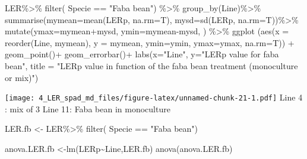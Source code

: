 \documentclass[
]{article}
\newenvironment{Shaded}{\begin{snugshade}}{\end{snugshade}}
\newcommand{\AttributeTok}[1]{\textcolor[rgb]{0.77,0.63,0.00}{#1}}
\newcommand{\FunctionTok}[1]{\textcolor[rgb]{0.00,0.00,0.00}{#1}}
\newcommand{\NormalTok}[1]{#1}
\newcommand{\OtherTok}[1]{\textcolor[rgb]{0.56,0.35,0.01}{#1}}
\newcommand{\SpecialCharTok}[1]{\textcolor[rgb]{0.00,0.00,0.00}{#1}}
\newcommand{\StringTok}[1]{\textcolor[rgb]{0.31,0.60,0.02}{#1}}
\begin{document}
\begin{Shaded}
\begin{Highlighting}[]
\NormalTok{LER}\SpecialCharTok{\%\textgreater{}\%}
  \FunctionTok{filter}\NormalTok{( Specie }\SpecialCharTok{==} \StringTok{"Faba bean"}\NormalTok{) }\SpecialCharTok{\%\textgreater{}\%}
  \FunctionTok{group\_by}\NormalTok{(Line)}\SpecialCharTok{\%\textgreater{}\%}
  \FunctionTok{summarise}\NormalTok{(}\AttributeTok{mymean=}\FunctionTok{mean}\NormalTok{(LERp, }\AttributeTok{na.rm=}\NormalTok{T),}
            \AttributeTok{mysd=}\FunctionTok{sd}\NormalTok{(LERp, }\AttributeTok{na.rm=}\NormalTok{T))}\SpecialCharTok{\%\textgreater{}\%}
  \FunctionTok{mutate}\NormalTok{(}\AttributeTok{ymax=}\NormalTok{mymean}\SpecialCharTok{+}\NormalTok{mysd, }\AttributeTok{ymin=}\NormalTok{mymean}\SpecialCharTok{{-}}\NormalTok{mysd, ) }\SpecialCharTok{\%\textgreater{}\%}
  \FunctionTok{ggplot}\NormalTok{ (}\FunctionTok{aes}\NormalTok{(}\AttributeTok{x =} \FunctionTok{reorder}\NormalTok{(Line, mymean), }\AttributeTok{y =}\NormalTok{ mymean,}
              \AttributeTok{ymin=}\NormalTok{ymin, }\AttributeTok{ymax=}\NormalTok{ymax, }\AttributeTok{na.rm=}\NormalTok{T)) }\SpecialCharTok{+} 
  \FunctionTok{geom\_point}\NormalTok{()}\SpecialCharTok{+}
  \FunctionTok{geom\_errorbar}\NormalTok{()}\SpecialCharTok{+}
  \FunctionTok{labs}\NormalTok{(}\AttributeTok{x=}\StringTok{"Line"}\NormalTok{, }\AttributeTok{y=}\StringTok{"LERp value for faba bean"}\NormalTok{, }\AttributeTok{title =} \StringTok{"LERp value in function of the faba bean treatment (monoculture or mix)"}\NormalTok{)}
\end{Highlighting}
\end{Shaded}

\texttt{[image: 4\_LER\_spad\_md\_files/figure-latex/unnamed-chunk-21-1.pdf]}
Line 4 : mix of 3 Line 11: Faba bean in monoculture

\begin{Shaded}
\begin{Highlighting}[]
\NormalTok{LER.fb }\OtherTok{\textless{}{-}}\NormalTok{ LER}\SpecialCharTok{\%\textgreater{}\%}
  \FunctionTok{filter}\NormalTok{( Specie }\SpecialCharTok{==} \StringTok{"Faba bean"}\NormalTok{)}

\NormalTok{anova.LER.fb }\OtherTok{\textless{}{-}}\FunctionTok{lm}\NormalTok{(LERp}\SpecialCharTok{\textasciitilde{}}\NormalTok{Line,LER.fb)}
\FunctionTok{anova}\NormalTok{(anova.LER.fb)}
\end{Highlighting}
\end{Shaded}
\end{document}
